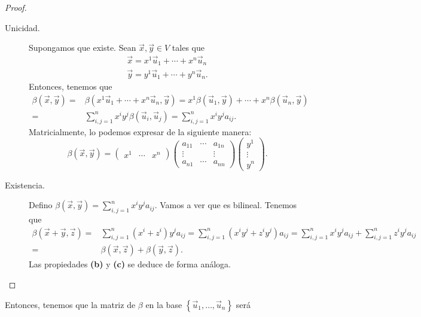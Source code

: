 \begin{proof}
\begin{description}
\item[Unicidad.] Supongamos que existe. Sean $\displaystyle \vec{x},\vec{y}\in V $ tales que 
	\[
	\begin{split}
	\vec{x} = x^{1}\vec{u}_{1} + \cdots +x^{n}\vec{u}_{n} \\
	\vec{y} = y^{1}\vec{u}_{1} + \cdots + y^{n}\vec{u}_{n}.
	\end{split}
	\]
Entonces, tenemos que 
\[
\begin{split}
	\beta\left(\vec{x}, \vec{y}\right) = & \beta\left(x^{1}\vec{u}_{1} + \cdots +x^{n}\vec{u}_{n}, \vec{y}\right) = x^{1}\beta\left(\vec{u}_{1}, \vec{y}\right) + \cdots + x^{n}\beta\left(\vec{u}_{n}, \vec{y}\right) \\
	= & \sum^{n}_{i,j = 1}x^{i}y^{j}\beta\left(\vec{u}_{i}, \vec{u}_{j}\right) = \sum^{n}_{i,j = 1}x^{i}y^{j}a_{ij}.
\end{split}
\]
Matricialmente, lo podemos expresar de la siguiente manera:
\[\beta\left(\vec{x}, \vec{y}\right) = \begin{pmatrix} x^{1} & \cdots & x^{n} \end{pmatrix} \begin{pmatrix} a_{11} & \cdots & a_{1n} \\
\vdots & & \vdots \\
a_{n1} & \cdots & a_{nn}\end{pmatrix} \begin{pmatrix} y^{1} \\ \vdots \\ y^{n} \end{pmatrix}.\]
\item[Existencia.] Defino $\displaystyle \beta\left(\vec{x}, \vec{y}\right) = \sum^{n}_{i,j = 1}x^{i}y^{j}a_{ij} $. Vamos a ver que es bilineal. Tenemos que 
\[
\begin{split}
	\beta\left(\vec{x}+\vec{y}, \vec{z}\right) = & \sum^{n}_{i,j = 1}\left(x^{i}+z^{i}\right)y^{j}a_{ij} = \sum^{n}_{i,j = 1}\left( x^{i}y^{j} + z^{i}y^{j}\right)a_{ij} = \sum^{n}_{i,j=1}x^{i}y^{j}a_{ij} + \sum^{n}_{i,j = 1}z^{i}y^{j}a_{ij}\\
	= &  \beta\left(\vec{x}, \vec{z}\right) + \beta\left(\vec{y}, \vec{z}\right).
\end{split}
\]
Las propiedades \textbf{(b)} y \textbf{(c)} se deduce de forma análoga.  	
\end{description}
\end{proof}
Entonces, tenemos que la matriz de $\displaystyle \beta  $ en la base $\displaystyle \left\{ \vec{u}_{1}, \ldots, \vec{u}_{n}\right\}  $ será
